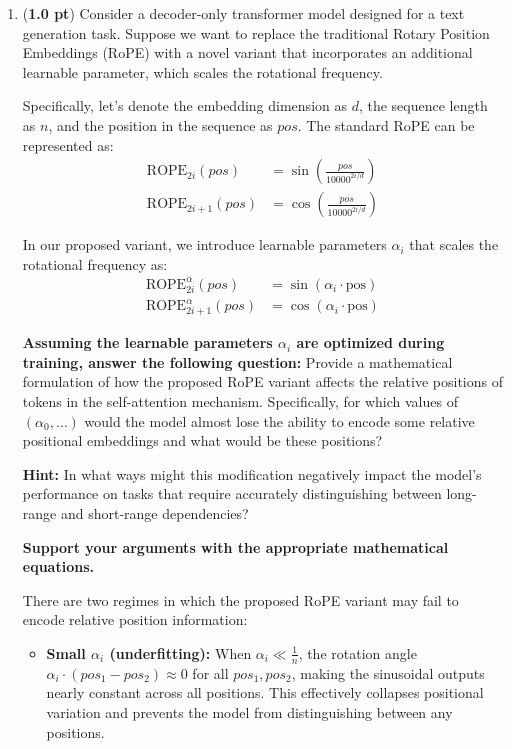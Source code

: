 \begin{enumerate}
\item ({\bf 1.0 pt}) Consider a decoder-only transformer model designed for a text generation task. Suppose we want to replace the traditional Rotary Position Embeddings (RoPE) with a novel variant that incorporates an additional learnable parameter, which scales the rotational frequency.

Specifically, let's denote the embedding dimension as $d$, the sequence length as $n$, and the position in the sequence as $pos$. The standard RoPE can be represented as:
$$
\begin{aligned}
\text{ROPE}_{2i}(pos) &= \sin(\frac{pos}{10000^{2i/d}}) \\
\text{ROPE}_{2i+1}(pos) &= \cos(\frac{pos}{10000^{2i/d}})
\end{aligned}
$$

In our proposed variant, we introduce learnable parameters $\alpha_{i}$ that scales the rotational frequency as:
$$
\begin{aligned}
\text{ROPE}^\alpha_{2i}(pos) &= \sin(\alpha_{i} \cdot \text{pos}) \\
\text{ROPE}^\alpha_{2i+1}(pos) &= \cos(\alpha_{i} \cdot \text{pos})
\end{aligned}
$$

{\bf Assuming the learnable parameters $\alpha_{i}$ are optimized during training, answer the following question:} Provide a mathematical formulation of how the proposed RoPE variant affects the relative positions of tokens in the self-attention mechanism. Specifically, for which values of $(\alpha_0,\ldots)$ would the model almost lose the ability to encode some relative positional embeddings and what would be these positions?

\textbf{Hint:} In what ways might this modification negatively impact the model's performance on tasks that require accurately distinguishing between long-range and short-range dependencies? 

{\bf Support your arguments with the appropriate mathematical equations.}
~
\begin{answerbox}[3in]
There are two regimes in which the proposed RoPE variant may fail to encode relative position information:

\begin{itemize}
    \item \textbf{Small $\alpha_i$ (underfitting):} When $\alpha_i \ll \frac{1}{n}$, the rotation angle $\alpha_i \cdot (pos_1 - pos_2) \approx 0$ for all $pos_1, pos_2$, making the sinusoidal outputs nearly constant across all positions. This effectively collapses positional variation and prevents the model from distinguishing between any positions.


\end{itemize}
\end{answerbox}
\end{enumerate}
